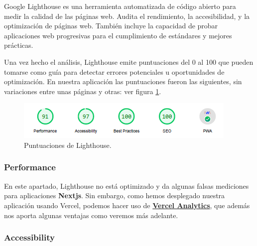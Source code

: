 \documentclass[12pt,twoside,titlepage]{report}
\begin{document}
Google Lighthouse es una herramienta automatizada de código abierto para medir la calidad de las páginas web. Audita el rendimiento, la accesibilidad, y la optimización de páginas web.
También incluye la capacidad de probar aplicaciones web progresivas para el cumplimiento de estándares y mejores prácticas.


Una vez hecho el análisis, Lighthouse emite puntuaciones del 0 al 100 que pueden tomarse como guía para detectar errores potenciales u oportunidades de optimización. En nuestra aplicación las puntuaciones fueron las siguientes, sin variaciones entre unas páginas y otras: ver figura \ref{fig:Lighthouse_resumen}.

\begin{figure}[H]
    \centering
    \includegraphics[scale=1.2]{Lighthouse/Resumen}
    \caption{Puntuaciones de Lighthouse.}
    \label{fig:Lighthouse_resumen}
\end{figure}

\subsubsection{Performance}

En este apartado, Lighthouse no está optimizado y da algunas falsas mediciones para aplicaciones \textbf{Nextjs}. Sin embargo, como hemos desplegado nuestra aplicación usando Vercel, podemos hacer uso de \hyperref[sec:funcionales]{\textbf{Vercel Analytics}}, que además nos aporta algunas ventajas como veremos más adelante.

\subsubsection{Accessibility}
\end{document}
